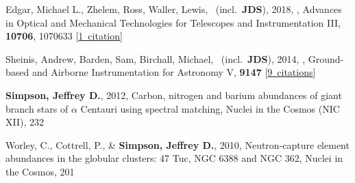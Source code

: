 \item[{\color{numcolor}\scriptsize4}] Edgar, Michael L., Zhelem, Ross, Waller, Lewis, \etal\ (incl.\ \textbf{JDS}), 2018, , Advances in Optical and Mechanical Technologies for Telescopes and Instrumentation III, \textbf{10706}, 1070633 [\href{https://ui.adsabs.harvard.edu/#abs/2018SPIE10706E..33E}{1~citation}]

\item[{\color{numcolor}\scriptsize3}] Sheinis, Andrew, Barden, Sam, Birchall, Michael, \etal\ (incl.\ \textbf{JDS}), 2014, , Ground-based and Airborne Instrumentation for Astronomy V, \textbf{9147} [\href{https://ui.adsabs.harvard.edu/#abs/2014SPIE.9147E..0YS}{9~citations}]

\item[{\color{numcolor}\scriptsize2}] \textbf{Simpson, Jeffrey D.}, 2012, Carbon, nitrogen and barium abundances of giant branch stars of {\ensuremath{\alpha}} Centauri using spectral matching, Nuclei in the Cosmos (NIC XII), 232

\item[{\color{numcolor}\scriptsize1}] Worley, C., Cottrell, P., \& \textbf{Simpson, Jeffrey D.}, 2010, Neutron-capture element abundances in the globular clusters: 47 Tuc, NGC 6388 and NGC 362, Nuclei in the Cosmos, 201